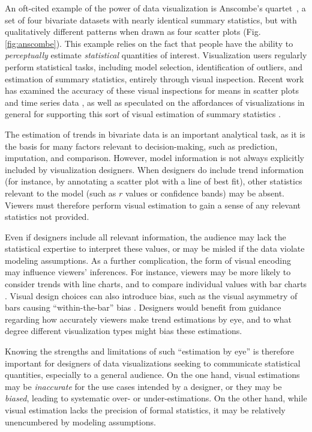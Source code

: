 \documentclass{sigchi}
\begin{document}
An oft-cited example of the power of data visualization is Anscombe's quartet~\cite{anscombe1973graphs}, a set of four bivariate datasets with nearly identical summary statistics, but with qualitatively different patterns when drawn as four scatter plots (Fig. \ref{fig:anscombe}). This example relies on the fact that people have the ability to \emph{perceptually} estimate \emph{statistical} quantities of interest. Visualization users regularly perform statistical tasks, including model selection, identification of outliers, and estimation of summary statistics, entirely through visual inspection. Recent work has examined the accuracy of these visual inspections for means in scatter plots \cite{gleicher2013perception} and time series data \cite{correll2012comparing}, as well as speculated on the affordances of visualizations in general for supporting this sort of visual estimation of summary statistics \cite{szafir2016four}.

The estimation of trends in bivariate data is an important analytical task, as it is the basis for many factors relevant to decision-making, such as prediction, imputation, and comparison. However, model information is not always explicitly included by visualization designers. When designers do include trend information (for instance, by annotating a scatter plot with a line of best fit), other statistics relevant to the model (such as $r$ values or confidence bands) may be absent. Viewers must therefore perform visual estimation to gain a sense of any relevant statistics not provided.

Even if designers include all relevant information, the audience may lack the statistical expertise to interpret these values, or may be misled if the data violate modeling assumptions. As a further complication, the form of visual encoding may influence viewers' inferences. For instance, viewers may be more likely to consider trends with line charts, and to compare individual values with bar charts \cite{zacks1999bars}. Visual design choices can also introduce bias, such as the visual asymmetry of bars causing ``within-the-bar'' bias \cite{newman2012bar}. Designers would benefit from guidance regarding how accurately viewers make trend estimations by eye, and to what degree different visualization types might bias these estimations.

Knowing the strengths and limitations of such ``estimation by eye'' is therefore important for designers of data visualizations seeking to communicate statistical quantities, especially to a general audience. On the one hand, visual estimations may be \emph{inaccurate} for the use cases intended by a designer, or they may be \emph{biased}, leading to systematic over- or under-estimations. On the other hand, while visual estimation lacks the precision of formal statistics, it may be relatively unencumbered by modeling assumptions.
\end{document}
